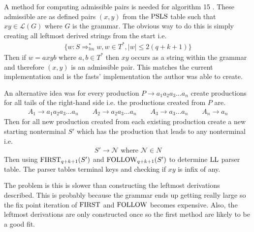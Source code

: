 A method for computing admissible pairs is needed for algorithm 15 \cite[15]{Vagner2007}. These admissible are as defined pairs $(x,y)$ from the $\text{PSLS}$ table such that $xy \in \mathcal{L}(G)$ where $G$ is the grammar. The obvious way to do this is simply creating all leftmost derived strings from the start i.e.
\begin{align*}
    \{w : S \Rightarrow_{lm}^* w, w \in T^*, |w| \leq 2 (q + k + 1)\}
\end{align*}
Then if $w = axyb$ where $a, b \in T^*$ then $xy$ occurs as a string within the grammar and therefore $(x, y)$ is an admissible pair. This matches the current implementation and is the fasts' implementation the author was able to create.

An alternative idea was for every production $P \to a_{1}a_{2}a_{3} \dots a_{n}$ create productions for all tails of the right-hand side i.e. the productions created from $P$ are.
\begin{gather*}
    A_{1} \to a_{1}a_{2}a_{3} \dots a_{n} \qquad A_{2} \to a_{2}a_{3} \dots a_{n} \qquad A_{3} \to a_{3} \dots a_{n} \qquad A_{n} \to  a_{n}
\end{gather*}
Then for all new production created from each existing production create a new starting nonterminal $S'$ which has the production that leads to any nonterminal i.e.
\begin{align*}
    S' \to  \mathcal{N} \text{ where } \mathcal{N} \in N
\end{align*}
Then using $\text{FIRST}_{q + k + 1}(S')$ and $\text{FOLLOW}_{q + k + 1}(S')$ to determine $\text{LL}$ parser table. The parser tables terminal keys and checking if $xy$ is infix of any.

The problem is this is slower than constructing the leftmost derivations described. This is probably because the grammar ends up getting really large so the fix point iteration of $\text{FIRST}$ and $\text{FOLLOW}$ becomes expensive. Also, the leftmost derivations are only constructed once so the first method are likely to be a good fit.